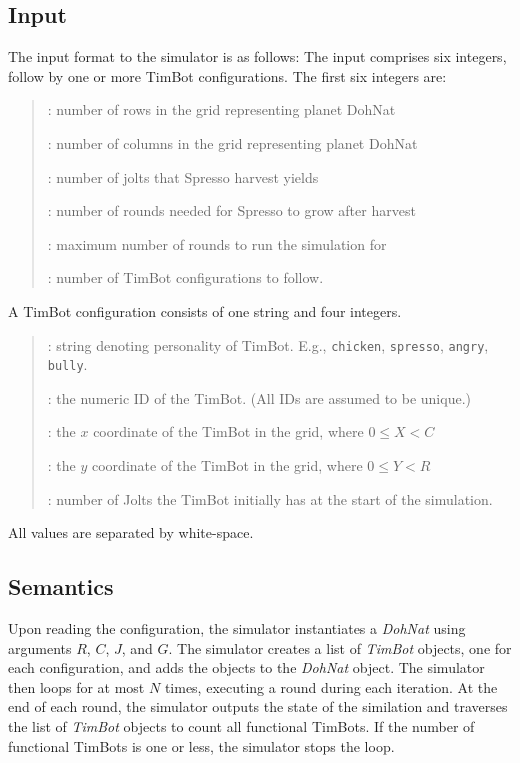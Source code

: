 \documentclass[12pt,pdftex]{article}
\begin{document}
\subsection*{Input}
The input format to the simulator is as follows: The input comprises 
six integers, follow by one or more TimBot configurations.  The
first six integers are:
\begin{quote}
\begin{description}\NoItemSpace
\item[R]: number of rows in the grid representing planet DohNat
\item[C]: number of columns in the grid representing planet DohNat
\item[J]: number of jolts that Spresso harvest yields
\item[G]: number of rounds needed for Spresso to grow after harvest
\item[N]: maximum number of rounds to run the simulation for
\item[T]: number of TimBot configurations to follow.
\end{description}
\end{quote}

A TimBot configuration consists of one string and four integers.
\begin{quote}
\begin{description}\NoItemSpace
\item[P]: string denoting personality of TimBot.  E.g.,
          {\tt chicken}, {\tt spresso}, {\tt angry}, {\tt bully}.
\item[I]: the numeric ID of the TimBot.  (All IDs are assumed to be unique.)
\item[X]: the $x$ coordinate of the TimBot in the grid, where  $0 \leq X < C$
\item[Y]: the $y$ coordinate of the TimBot in the grid, where  $0 \leq Y < R$
\item[E]: number of Jolts the TimBot initially has at the start of 
          the simulation.
\end{description}
\end{quote}
All values are separated by white-space.  

\subsection*{Semantics}
Upon reading the configuration, the simulator instantiates a {\it
DohNat} using arguments $R$, $C$, $J$, and $G$.  The simulator
creates a list of {\it TimBot} objects, one for each configuration,
and adds the objects to the {\it DohNat} object.  The simulator
then loops for at most $N$ times, executing a round during each
iteration.  At the end of each round, the simulator outputs the
state of the similation and traverses the list of {\it TimBot}
objects to count all functional TimBots.  If the number of functional
TimBots is one or less, the simulator stops the loop.
\end{document}
